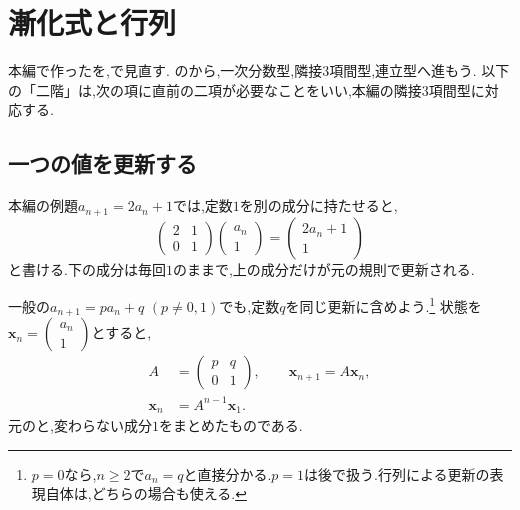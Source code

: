
\section{漸化式と行列}\label{節：特性方程式を行列で見直す}

本編で作ったを,で見直す.
のから,一次分数型,隣接3項間型,連立型へ進もう.
以下の「二階」は,次の項に直前の二項が必要なことをいい,本編の隣接3項間型に対応する.

\subsection{一つの値を更新する}\label{節：一つの値の更新を行列で書く}

本編の例題$a_{n+1}=2a_n+1$では,定数$1$を別の成分に持たせると,
\[
  \begin{pmatrix}2&1\\0&1\end{pmatrix}
  \begin{pmatrix}a_n\\1\end{pmatrix}
  =\begin{pmatrix}2a_n+1\\1\end{pmatrix}
\]
と書ける.下の成分は毎回$1$のままで,上の成分だけが元の規則で更新される.

一般の$a_{n+1}=pa_n+q$ $(p\ne0,1)$でも,定数$q$を同じ更新に含めよう.\footnote{$p=0$なら,$n\ge2$で$a_n=q$と直接分かる.$p=1$は後で扱う.行列による更新の表現自体は,どちらの場合も使える.}
状態を$\boldsymbol{x}_n=\begin{pmatrix}a_n\\1\end{pmatrix}$とすると,
\[
  \begin{aligned}
    A&=\begin{pmatrix}p&q\\0&1\end{pmatrix},\qquad
    \boldsymbol{x}_{n+1}=A\boldsymbol{x}_n,\\
    \boldsymbol{x}_n&=A^{n-1}\boldsymbol{x}_1.
  \end{aligned}
\]
元のと,変わらない成分$1$をまとめたものである.

